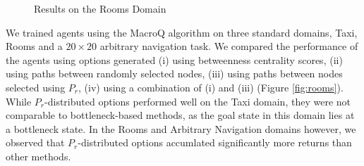 \label{sec:experiments}

\begin{figure}[h]
\centering
{}
\label{fig:rooms}
\caption{Results on the Rooms Domain}
\end{figure}

We trained agents using the MacroQ algorithm on three standard domains, Taxi,
Rooms and a $20\times20$ arbitrary navigation task. We compared the performance
of the agents using options generated (i) using betweenness centrality scores,
(ii) using paths between randomly selected nodes, (iii) using paths between
nodes selected using $P_r$, (iv) using a combination of (i) and (iii)
(Figure \autoref{fig:rooms}). While $P_r$-distributed options performed
well on the Taxi domain, they were not comparable to bottleneck-based methods,
as the goal state in this domain lies at a bottleneck state. In the Rooms and
Arbitrary Navigation domains however, we observed that $P_r$-distributed options
accumlated significantly more returns than other methods. 



